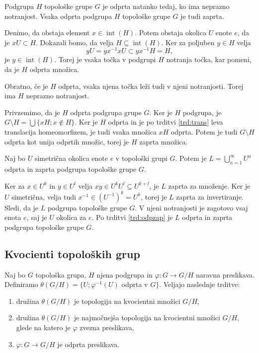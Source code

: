 \documentclass[mat1]{fmfdelo}
\DeclareMathOperator{\interior}{int}
\begin{document}
\begin{trditev}\label{trd:odpzap}
Podgrupa $H$ topološke grupe $G$ je odprta natanko tedaj, ko ima ne\-praz\-no not\-ran\-jost. Vsaka odprta podgrupa $H$ topološke grupe $G$ je tudi zaprta.
\end{trditev}

\begin{dokaz}
Denimo, da obstaja element $x \in \interior(H)$. Potem obstaja okolica $U$ enote $e$, da je $xU \subset H$. Dokazali bomo, da velja $H \subseteq \interior(H)$. Ker za poljuben $y \in H$ velja \[yU = yx^{-1}xU \subset yx^{-1}H = H,\] je $y \in \interior(H)$. Torej je vsaka točka v podgrupi $H$ notranja točka, kar pomeni, da je $H$ odprta množica.

Obratno, če je $H$ odprta, vsaka njena točka leži tudi v njeni notranjosti. Torej ima $H$ neprazno notranjost.

Privzemimo, da je $H$ odprta podgrupa grupe $G$. Ker je $H$ podgrupa, je $G\setminus H = \bigcup \lbrace xH ; x \notin H \rbrace$. Ker je $H$ odprta in je po trditvi \ref{trd:trans} leva translacija homeomorfizem, je tudi vsaka množica $xH$ odprta. Potem je tudi $G \setminus H$ odprta kot unija odprtih množic, torej je $H$ zaprta množica.
\end{dokaz}

\begin{trditev}\label{trd:podgrupaunija}
Naj bo $U$ simetrična okolica enote $e$ v topološki grupi $G$. Potem je $L = \bigcup_{n=1}^{\infty} U^n$ odprta in zaprta podgrupa topološke grupe $G$.
\end{trditev}

\begin{dokaz}
Ker za $x \in U^k$ in $y \in U^l$ velja $xy \in U^kU^l \subseteq U^{k+l}$, je $L$ zaprta za množenje. Ker je $U$ simetrična, velja tudi $x^{-1} \in (U^{-1})^k = U^k$, torej je $L$ zaprta za invertiranje. Sledi, da je $L$ podgrupa topološke grupe $G$. V njeni notranjosti je zagotovo vsaj enota $e$, saj je $U$ okolica za $e$. Po trditvi \ref{trd:odpzap} je $L$ odprta in zaprta podgrupa topološke grupe $G$.
\end{dokaz}

\subsection{Kvocienti topoloških grup}

\begin{izrek}\label{izr:topkvocienta}
Naj bo $G$ topološka grupa, $H$ njena podgrupa in $\varphi\colon G \to G/H$ naravna preslikava. Definiramo $\theta(G/H) = \lbrace U ; \varphi^{-1}(U)$ odprta v $G \rbrace$.
Veljajo naslednje trditve:
\begin{enumerate}
\item družina $\theta(G/H)$ je topologija na kvocientni množici $G/H$,
\item družina $\theta(G/H)$ je najmočnejša topologija na kvocientni množici $G/H$, glede na katero je $\varphi$ zvezna preslikava,
\item $\varphi: G \to G/H$ je odprta preslikava.
\end{enumerate}
\end{izrek}
\end{document}
